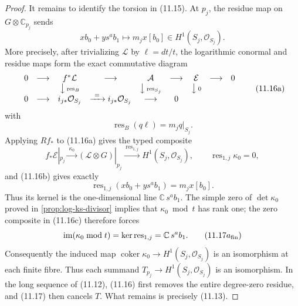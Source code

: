 \begin{proof}
It remains to identify the torsion in (11.15).  At $p_j$, the residue map on
$G\otimes\mathbb C_{p_j}$ sends
\[
 x b_0+y s^ab_1\longmapsto m_jx[b_0]
 \in H^1(S_j,\mathcal O_{S_j}).
\tag{11.17}
\]
More precisely, after trivializing $\mathcal L$ by
$\ell=dt/t$, the logarithmic conormal and residue maps form the exact
commutative diagram
\[
\begin{array}{ccccccccc}
0&\longrightarrow&f^*\mathcal L&\longrightarrow&\mathcal A
 &\longrightarrow&\mathcal E&\longrightarrow&0\\
&&\big\downarrow\,{\scriptstyle\operatorname{res}_B}
&&\big\downarrow\,{\scriptstyle\operatorname{res}_{S_j}}
&&\big\downarrow\,{\scriptstyle 0}&&\\
0&\longrightarrow&i_{j*}\mathcal O_{S_j}&\xrightarrow{\ =\ }
 i_{j*}\mathcal O_{S_j}&\longrightarrow&0&&
\end{array}
\tag{11.16a}
\]
with
\[
 \operatorname{res}_B(q\ell)=m_jq|_{S_j}.
\tag{11.16b}
\]
Applying $Rf_*$ to (11.16a) gives the typed composite
\[
 f_*\mathcal E|_{p_j}\xrightarrow{\ \kappa_0\ }
 (\mathcal L\otimes G)|_{p_j}
 \xrightarrow{\ \operatorname{res}_{1,j}\ }
 H^1(S_j,\mathcal O_{S_j}),
 \qquad \operatorname{res}_{1,j}\kappa_0=0,
\tag{11.16c}
\]
and (11.16b) gives exactly
\[
 \operatorname{res}_{1,j}(xb_0+ys^ab_1)=m_jx[b_0].
\]
Thus its kernel is the one-dimensional line
$\mathbb C\,s^ab_1$.  The simple zero of $\det\kappa_0$ proved in
\cref{prop:log-ks-divisor} implies that $\kappa_0\bmod t$ has rank one;
the zero composite in (11.16c) therefore forces
\[
 \operatorname{im}(\kappa_0\bmod t)
 =\ker\operatorname{res}_{1,j}
 =\mathbb C\,s^ab_1.
\tag{$11.17a_{\mathrm{fin}}$}
\]
Consequently the induced map
$\operatorname{coker}\kappa_0\to H^1(S_j,\mathcal O_{S_j})$ is an
isomorphism at each finite fibre.  Thus each summand
$T_{p_j}\to H^1(S_j,\mathcal O_{S_j})$ is an isomorphism.  In the long
sequence of (11.12), (11.16) first removes the entire degree-zero residue,
and (11.17) then cancels $T$.  What remains is precisely (11.13).
\end{proof}
